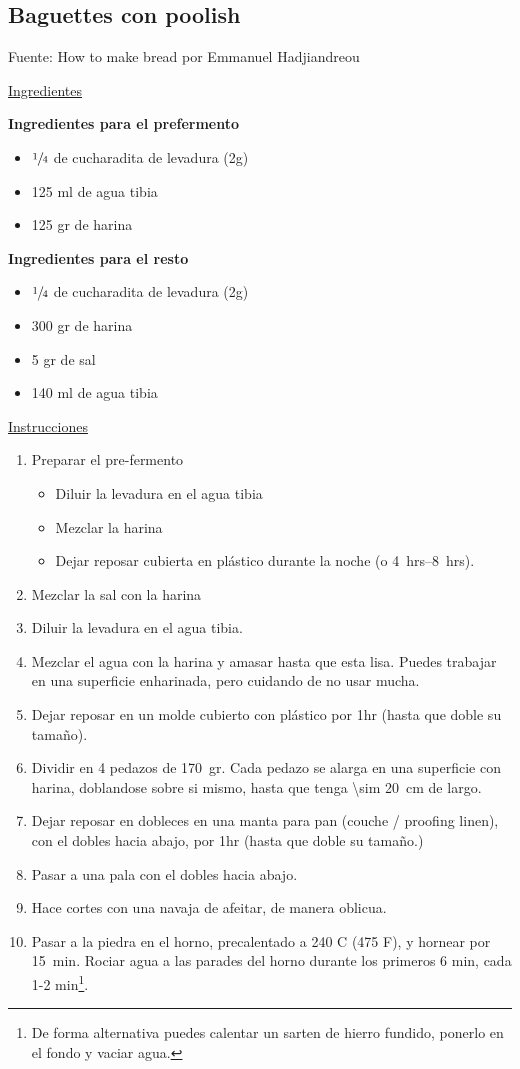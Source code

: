 \subsection{Baguettes con poolish}

Fuente: How to make bread por Emmanuel Hadjiandreou

\underline{Ingredientes}

\textbf{Ingredientes para el prefermento}
\begin{itemize}
\item $\sfrac{1}{4}$ de cucharadita de levadura (2g)
\item 125 ml de agua tibia
\item 125 gr de harina
\end{itemize}

\textbf{Ingredientes para el resto}
\begin{itemize}
\item $\sfrac{1}{4}$ de cucharadita de levadura (2g)
\item 300 gr de harina
\item 5 gr de sal
\item 140 ml de agua tibia
\end{itemize}

\underline{Instrucciones}
\begin{enumerate}
\item Preparar el pre-fermento
\begin{itemize}
\item Diluir la levadura en el agua tibia
\item Mezclar la harina
\item Dejar reposar cubierta en plástico durante la noche (o \SIrange{4}{8}{hrs}).
\end{itemize} 
\item Mezclar la sal con la harina
\item Diluir la levadura en el agua tibia.
\item Mezclar el agua con la harina y amasar hasta que esta lisa. Puedes trabajar en una superficie enharinada, pero cuidando de no usar mucha.
\item Dejar reposar en un molde cubierto con plástico por \Sim 1hr (hasta que doble su tamaño).
\item Dividir en 4 pedazos de \SI{170}{gr}. Cada pedazo se alarga en una superficie con harina, doblandose sobre si mismo, hasta que tenga \SI{\sim 20}{cm} de largo.
\item Dejar reposar en dobleces en una manta para pan (couche / proofing linen), con el dobles hacia abajo, por \Sim 1hr (hasta que doble su tamaño.)
\item Pasar a una pala con el dobles hacia abajo.
\item Hace cortes con una navaja de afeitar, de manera oblicua.
\item Pasar a la piedra en el horno, precalentado a 240 C (475 F), y hornear por \SI{15}{min}. Rociar agua a las parades del horno durante los primeros 6 min, cada 1-2 min\footnote{De forma alternativa puedes calentar un sarten de hierro fundido, ponerlo en el fondo y vaciar agua.}.
\end{enumerate}
